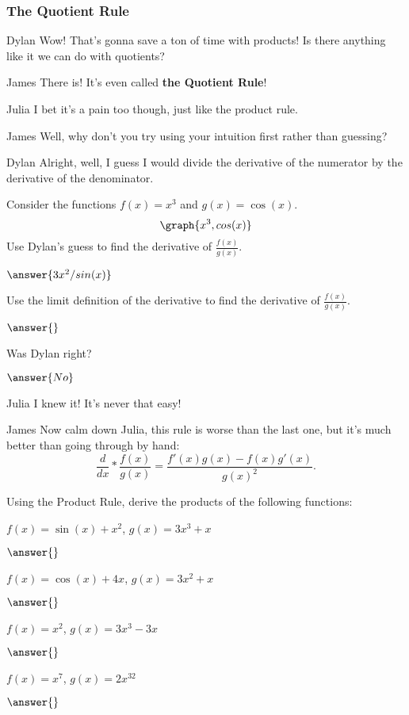 \documentclass{ximera}
\begin{document}
\subsubsection{The Quotient Rule}
\begin{dialogue}
\item[Dylan] Wow! That's gonna save a ton of time with products! Is there anything like it we can do with quotients?
\item[James] There is! It's even called \textbf{the Quotient Rule}!
\item[Julia] I bet it's a pain too though, just like the product rule.
\item[James] Well, why don't you try using your intuition first rather than guessing?
\item[Dylan] Alright, well, I guess I would divide the derivative of the numerator by the derivative of the denominator.
\end{dialogue}
\begin{question}
Consider the functions $f(x) = x^3$ and $g(x) = \cos(x)$.
\[
\graph{x^3, cos(x)}
\]
Use Dylan's guess to find the derivative of $\frac{f(x)}{g(x)}$.

$\answer{3x^2/sin(x)}$

Use the limit definition of the derivative to find the derivative of $\frac{f(x)}{g(x)}$.

$\answer{}$

Was Dylan right?

$\answer{No}$
\end{question}
\begin{dialogue}
\item[Julia] I knew it! It's never that easy!
\item[James] Now calm down Julia, this rule is worse than the last one, but it's much better than going through by hand: $$\frac{d}{dx}*\frac{f(x)}{g(x)} = \frac{f'(x)g(x)-f(x)g'(x)}{g(x)^2}\text{.}$$
\end{dialogue}
\begin{question}
Using the Product Rule, derive the products of the following functions:

$f(x) = \sin(x)+x^2$, $g(x) = 3x^3+x$

$\answer{}$

$f(x) = \cos(x)+4x$, $g(x) = 3x^2+x$

$\answer{}$

$f(x) = x^2$, $g(x) = 3x^3-3x$

$\answer{}$

$f(x) = x^7$, $g(x) = 2x^32$

$\answer{}$
\end{question}
\end{document}
